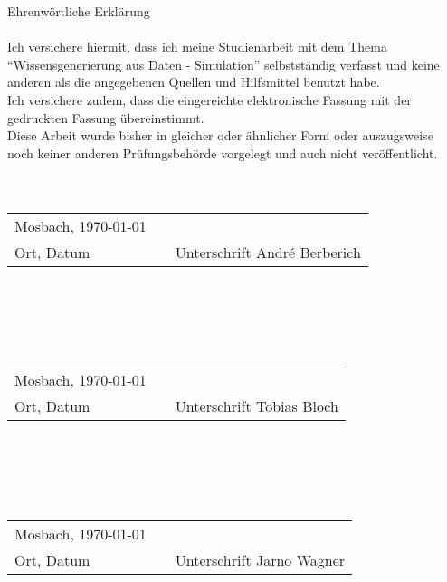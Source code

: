 {\huge Ehrenwörtliche Erklärung}
\\
\\
Ich versichere hiermit, dass ich meine Studienarbeit mit dem Thema \enquote{Wissensgenerierung aus Daten - Simulation} selbstständig verfasst und keine anderen als die angegebenen Quellen und Hilfsmittel benutzt habe.
\\
Ich versichere zudem, dass die eingereichte elektronische Fassung mit der gedruckten Fassung übereinstimmt.
\\
Diese Arbeit wurde bisher in gleicher oder ähnlicher Form oder auszugsweise noch keiner anderen Prüfungsbehörde vorgelegt und auch nicht veröffentlicht.
\\
\\
\\
\begin{tabular}{lp{2em}l} 
 Mosbach, \today && \hspace{4cm} \\\cline{1-1}\cline{3-3} 
 Ort, Datum     && Unterschrift André Berberich
\end{tabular}
\\
\\
\\
\\
\begin{tabular}{lp{2em}l} 
	Mosbach, \today && \hspace{4cm} \\\cline{1-1}\cline{3-3} 
	Ort, Datum     && Unterschrift Tobias Bloch
\end{tabular}
\\
\\
\\
\\
\begin{tabular}{lp{2em}l} 
	Mosbach, \today && \hspace{4cm} \\\cline{1-1}\cline{3-3} 
	Ort, Datum     && Unterschrift Jarno Wagner
\end{tabular}
\newpage
 